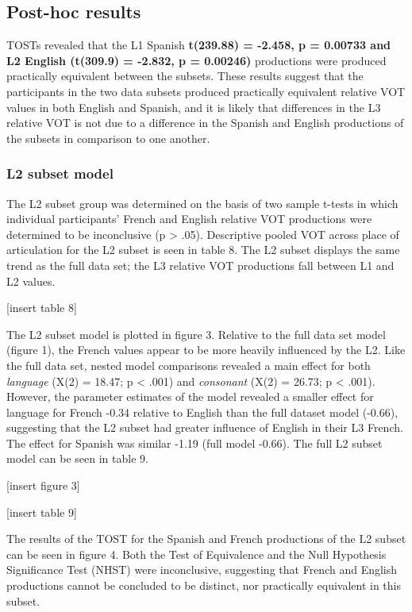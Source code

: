 \documentclass[
  english,
  man]{apa6}
\begin{document}
\hypertarget{post-hoc-results}{%
\subsection{Post-hoc results}\label{post-hoc-results}}

TOSTs revealed that the L1 Spanish \textbf{t(239.88) = -2.458, p = 0.00733 and L2 English (t(309.9) = -2.832, p = 0.00246)} productions were produced practically equivalent between the subsets.
These results suggest that the participants in the two data subsets produced practically equivalent relative VOT values in both English and Spanish, and it is likely that differences in the L3 relative VOT is not due to a difference in the Spanish and English productions of the subsets in comparison to one another.

\hypertarget{l2-subset-model}{%
\subsubsection{L2 subset model}\label{l2-subset-model}}

The L2 subset group was determined on the basis of two sample t-tests in which individual participants' French and English relative VOT productions were determined to be inconclusive (p \textgreater{} .05).
Descriptive pooled VOT across place of articulation for the L2 subset is seen in table 8. The L2 subset displays the same trend as the full data set; the L3 relative VOT productions fall between L1 and L2 values.

{[}insert table 8{]}

The L2 subset model is plotted in figure 3.
Relative to the full data set model (figure 1), the French values appear to be more heavily influenced by the L2.
Like the full data set, nested model comparisons revealed a main effect for both \emph{language} (X(2) = 18.47; p \textless{} .001) and \emph{consonant} (X(2) = 26.73; p \textless{} .001).
However, the parameter estimates of the model revealed a smaller effect for language for French -0.34 relative to English than the full dataset model (-0.66), suggesting that the L2 subset had greater influence of English in their L3 French.
The effect for Spanish was similar -1.19 (full model -0.66). The full L2 subset model can be seen in table 9.

{[}insert figure 3{]}

{[}insert table 9{]}

The results of the TOST for the Spanish and French productions of the L2 subset can be seen in figure 4. Both the Test of Equivalence and the Null Hypothesis Significance Test (NHST) were inconclusive, suggesting that French and English productions cannot be concluded to be distinct, nor practically equivalent in this subset.
\end{document}

